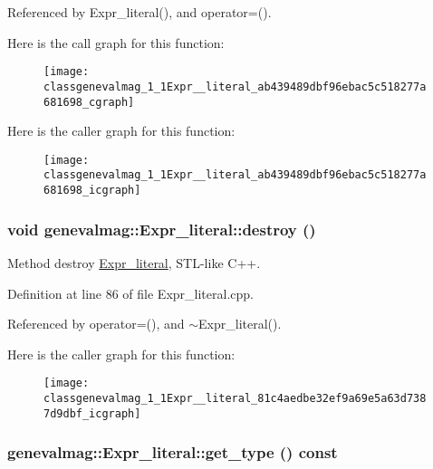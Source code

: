Referenced by Expr\_\-literal(), and operator=().

Here is the call graph for this function:\nopagebreak
\begin{figure}[H]
\begin{center}
\leavevmode
\texttt{[image: classgenevalmag\_1\_1Expr\_\_literal\_ab439489dbf96ebac5c518277a681698\_cgraph]}
\end{center}
\end{figure}


Here is the caller graph for this function:\nopagebreak
\begin{figure}[H]
\begin{center}
\leavevmode
\texttt{[image: classgenevalmag\_1\_1Expr\_\_literal\_ab439489dbf96ebac5c518277a681698\_icgraph]}
\end{center}
\end{figure}
\hypertarget{classgenevalmag_1_1Expr__literal_81c4aedbe32ef9a69e5a63d7387d9dbf}{
\subsubsection[{destroy}]{\setlength{\rightskip}{0pt plus 5cm}void genevalmag::Expr\_\-literal::destroy ()}}
\label{classgenevalmag_1_1Expr__literal_81c4aedbe32ef9a69e5a63d7387d9dbf}


Method destroy \hyperlink{classgenevalmag_1_1Expr__literal}{Expr\_\-literal}, STL-like C++. 

Definition at line 86 of file Expr\_\-literal.cpp.

Referenced by operator=(), and $\sim$Expr\_\-literal().

Here is the caller graph for this function:\nopagebreak
\begin{figure}[H]
\begin{center}
\leavevmode
\texttt{[image: classgenevalmag\_1\_1Expr\_\_literal\_81c4aedbe32ef9a69e5a63d7387d9dbf\_icgraph]}
\end{center}
\end{figure}
\hypertarget{classgenevalmag_1_1Expr__literal_e821eeb6e591dfe1d8ee62a38367618e}{
\subsubsection[{get\_\-type}]{ genevalmag::Expr\_\-literal::get\_\-type () const}}
\label{classgenevalmag_1_1Expr__literal_e821eeb6e591dfe1d8ee62a38367618e}


